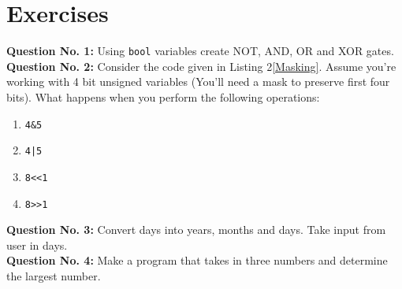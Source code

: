 \documentclass[12pt,a4paper]{article}
\begin{document}
\section{Exercises}
\noindent\textbf{Question No. 1:} Using \verb|bool| variables create NOT, AND, OR and XOR gates.\\
\noindent\textbf{Question No. 2:} Consider the code given in Listing 2\ref{Masking}. Assume you're working with 4 bit unsigned variables (You'll need a mask to preserve first four bits). What happens when you perform the following operations:
\begin{enumerate}
\item \verb|4&5|
\item \verb$4|5$
\item \verb|8<<1|
\item \verb|8>>1|
\end{enumerate}
\noindent\textbf{Question No. 3:} Convert days into years, months and days. Take input from user in days.\\
\noindent\textbf{Question No. 4:} Make a program that takes in three numbers and determine the largest number.\\
\end{document}
